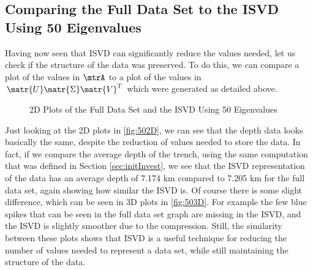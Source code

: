 \subsection{Comparing the Full Data Set to the ISVD Using 50 Eigenvalues}\label{sec:comparingISVD}
Having now seen that ISVD can significantly reduce the values needed, let us check if the structure of the data was preserved. To do this, we can compare a plot of the values in $\mtrA$ 
to a plot of the values in $\matr{U}\matr{\Sigma}\matr{V}^T$ which were generated as detailed above.
\begin{figure}[H]
    \centering
    \qquad 
    \caption{2D Plots of the Full Data Set and the ISVD Using 50 Eigenvalues}%
    \label{fig:502D}%
\end{figure}
Just looking at the 2D plots in \autoref{fig:502D}, we can see that the depth data looks basically the same, despite the reduction of values needed to store the data.
In fact, if we compare the average depth of the trench, using the same computation that was defined in Section \ref{sec:initInvest}, we see that the ISVD representation of the data has an average depth of 7.174 km compared to 7.205 km for the full data set, again showing how similar the ISVD is. Of course there is some slight difference, which can be seen in 3D plots in \autoref{fig:503D}. For example the few blue spikes that can be seen in the full data set graph are missing in the ISVD, and the ISVD is slightly smoother due to the compression. Still, the similarity between these plots shows that ISVD is a useful technique for reducing the number of values needed to represent a data set, while still maintaining the structure of the data.
